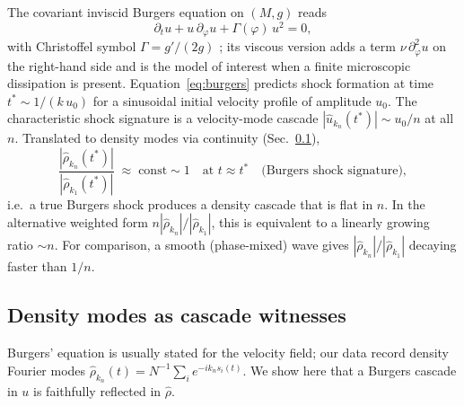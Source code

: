 \documentclass[aps,pre,twocolumn,superscriptaddress,longbibliography,floatfix]{revtex4-2}
\begin{document}
The covariant inviscid Burgers equation on $(M,g)$ reads
\begin{equation}
\partial_t u + u\,\partial_\varphi u + \Gamma(\varphi)\,u^2 = 0,
\label{eq:burgers}
\end{equation}
with Christoffel symbol $\Gamma=g'/(2g)$ \cite{KhesinMisiolek2007};
its viscous version adds a term $\nu\,\partial_\varphi^2 u$ on
the right-hand side and is the model of interest when a finite
microscopic dissipation is present.
Equation~\eqref{eq:burgers} predicts shock formation at time
$t^* \sim 1/(k\,u_0)$ for a sinusoidal initial velocity profile
of amplitude $u_0$. The characteristic shock signature is a
velocity-mode cascade $|\hat u_{k_n}(t^*)|\sim u_0/n$ at all
$n$. Translated to density modes via continuity
(Sec.~\ref{sec:rhoVSu}),
\begin{equation}
\frac{|\hat\rho_{k_n}(t^*)|}{|\hat\rho_{k_1}(t^*)|}
\;\approx\; \text{const} \sim 1\quad
\text{at } t\!\approx\!t^*
\quad\text{(Burgers shock signature)},
\label{eq:burgersratio}
\end{equation}
i.e.\ a true Burgers shock produces a density cascade that is
flat in $n$. In the alternative weighted form
$n|\hat\rho_{k_n}|/|\hat\rho_{k_1}|$, this is equivalent to a
linearly growing ratio $\sim n$. For comparison, a smooth
(phase-mixed) wave gives $|\hat\rho_{k_n}|/|\hat\rho_{k_1}|$
decaying faster than $1/n$.

\subsection{Density modes as cascade witnesses}
\label{sec:rhoVSu}

Burgers' equation is usually stated for the velocity field; our
data record density Fourier modes
$\hat\rho_{k_n}(t)=N^{-1}\sum_i e^{-ik_n s_i(t)}$. We show here
that a Burgers cascade in $u$ is faithfully reflected in $\hat\rho$.
\end{document}
